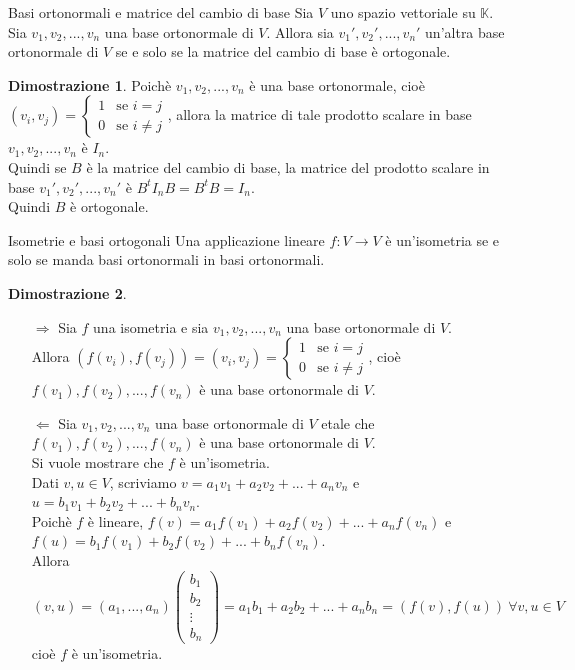 \documentclass[a4paper]{article}
\theoremstyle{definition}
\newtheorem*{dimm}{Dimostrazione}
\begin{document}
	\begin{teo}{Basi ortonormali e matrice del cambio di base}
		Sia $V$ uno spazio vettoriale su $\mathbb{K}$. \\
		Sia $v_1, v_2, ..., v_n$ una base ortonormale di $V$. Allora sia $v_1', v_2', ..., v_n'$ un'altra base ortonormale di $V$
		se e solo se la matrice del cambio di base è ortogonale.
	\end{teo}
	\begin{dimm}
		Poichè $v_1, v_2, ..., v_n$ è una base ortonormale, cioè $(v_i, v_j) = \begin{cases}
			1 & \text{se } i = j \\
			0 & \text{se } i \ne j
		\end{cases}$, allora la matrice di tale prodotto scalare in base $v_1, v_2, ..., v_n$ è $I_n$. \\
		Quindi se $B$ è la matrice del cambio di base, la matrice del prodotto scalare in base $v_1', v_2', ..., v_n'$ è $B^tI_nB = B^tB = I_n$. \\
		Quindi $B$ è ortogonale.
	\end{dimm}

	\begin{teo}{Isometrie e basi ortogonali}
		Una applicazione lineare $f: V \to V$ è un'isometria se e solo se manda basi ortonormali in basi ortonormali.
	\end{teo}
	\begin{dimm}
		\begin{itemize}
			\item[$\Rightarrow$] Sia $f$ una isometria e sia $v_1, v_2, ..., v_n$ una base ortonormale di $V$. \\
			Allora $(f(v_i), f(v_j)) = (v_i, v_j) = \begin{cases}
				1 & \text{se } i = j \\
				0 & \text{se } i \ne j
			\end{cases}$, cioè $f(v_1), f(v_2), ..., f(v_n)$ è una base ortonormale di $V$.
			\item[$\Leftarrow$] Sia $v_1, v_2, ..., v_n$ una base ortonormale di $V$ etale che $f(v_1), f(v_2), ..., f(v_n)$ è una base ortonormale di $V$. \\
			Si vuole mostrare che $f$ è un'isometria. \\
			Dati $v, u \in V$, scriviamo $v = a_1v_1 + a_2v_2 + ... + a_nv_n$ e $u = b_1v_1 + b_2v_2 + ... + b_nv_n$. \\
			Poichè $f$ è lineare, $f(v) = a_1f(v_1) + a_2f(v_2) + ... + a_nf(v_n)$ e $f(u) = b_1f(v_1) + b_2f(v_2) + ... + b_nf(v_n)$. \\
			Allora $(v, u) = (a_1, ..., a_n) \begin{pmatrix}
				b_1 \\
				b_2 \\
				\vdots \\
				b_n
			\end{pmatrix} = a_1b_1 + a_2b_2 + ... + a_nb_n = (f(v), f(u)) \ \forall v, u \in V$ cioè $f$ è un'isometria.
		\end{itemize}
	\end{dimm}
\end{document}
